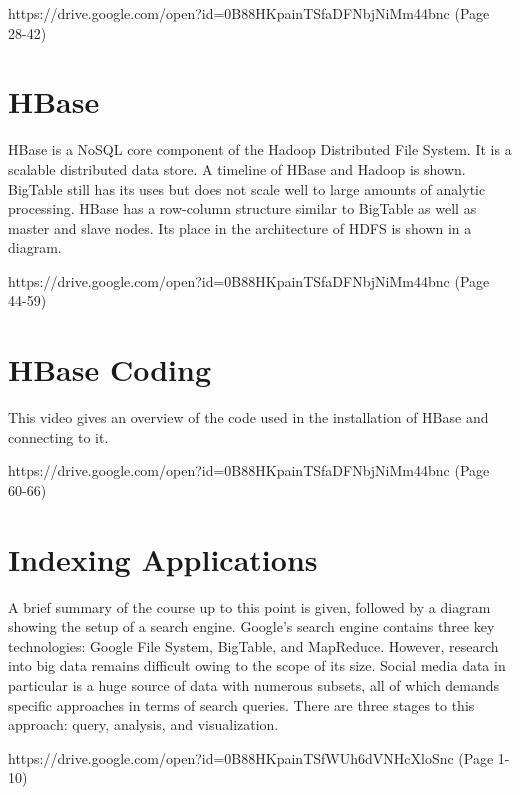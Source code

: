 {https://drive.google.com/open?id=0B88HKpainTSfaDFNbjNiMm44bnc
  (Page 28-42)}

\section{HBase}

HBase is a NoSQL core component of the Hadoop Distributed File System.
It is a scalable distributed data store. A timeline of HBase and Hadoop
is shown. BigTable still has its uses but does not scale well to large
amounts of analytic processing. HBase has a row-column structure similar
to BigTable as well as master and slave nodes. Its place in the
architecture of HDFS is shown in a diagram.


{https://drive.google.com/open?id=0B88HKpainTSfaDFNbjNiMm44bnc
  (Page 44-59)}

\section{HBase Coding}

This video gives an overview of the code used in the installation of
HBase and connecting to it.


{https://drive.google.com/open?id=0B88HKpainTSfaDFNbjNiMm44bnc
  (Page 60-66)}

\section{Indexing Applications}

A brief summary of the course up to this point is given, followed by a
diagram showing the setup of a search engine. Google's search engine
contains three key technologies: Google File System, BigTable, and
MapReduce. However, research into big data remains difficult owing to
the scope of its size. Social media data in particular is a huge source
of data with numerous subsets, all of which demands specific approaches
in terms of search queries. There are three stages to this approach:
query, analysis, and visualization.


{https://drive.google.com/open?id=0B88HKpainTSfWUh6dVNHcXloSnc
  (Page 1-10)}

